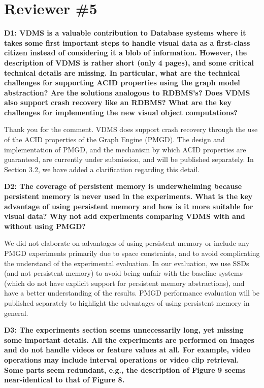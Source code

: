 \documentclass[11pt]{proposalnsf}
\begin{document}
\newpage
\section{Reviewer \#5}

\noindent %
\textbf{
D1: VDMS is a valuable contribution to Database systems where it takes
some first important steps to handle visual data as a first-class citizen
instead of considering it a blob of information. However, the description
of VDMS is rather short (only 4 pages), and some critical technical
details are missing. In particular, what are the technical challenges
for supporting ACID properties using the graph model abstraction? Are
the solutions analogous to RDBMS’s? Does VDMS also support crash
recovery like an RDBMS? What are the key challenges for implementing
the new visual object computations?
}\bigskip

Thank you for the comment.
VDMS does support crash recovery through the use of the ACID properties
of the Graph Engine (PMGD).
The design and implementation of PMGD, and the mechanism by which ACID properties
are guaranteed, are currently under submission, and will be published separately.
In Section 3.2, we have added a clarification regarding this detail.

\bigskip
\noindent %
\textbf{
D2: The coverage of persistent memory is underwhelming because persistent memory
is never used in the experiments.
What is the key advantage of using persistent memory and how is it
more suitable for visual data? Why not add experiments comparing VDMS with
and without using PMGD?
}\bigskip

We did not elaborate on advantages of using persistent memory or include
any PMGD experiments primarily due to space constraints, and to avoid
complicating the understand of the experimental evaluation.
In our evaluation, we use SSDs (and not persistent memory) to avoid
being unfair with the baseline systems (which do not have explicit support for
persistent memory abstractions), and have a better understanding of
the results.
PMGD performance evaluation will be published separately to highlight
the advantages of using persistent memory in general.

\bigskip
\noindent %
\textbf{
D3: The experiments section seems unnecessarily long, yet missing some important
details. All the experiments are performed on images and do not handle videos or feature
values at all. For example, video operations may include interval operations or video
clip retrieval. Some parts seem redundant, e.g., the description of Figure 9 seems
near-identical to that of Figure 8.
}\bigskip
\end{document}
